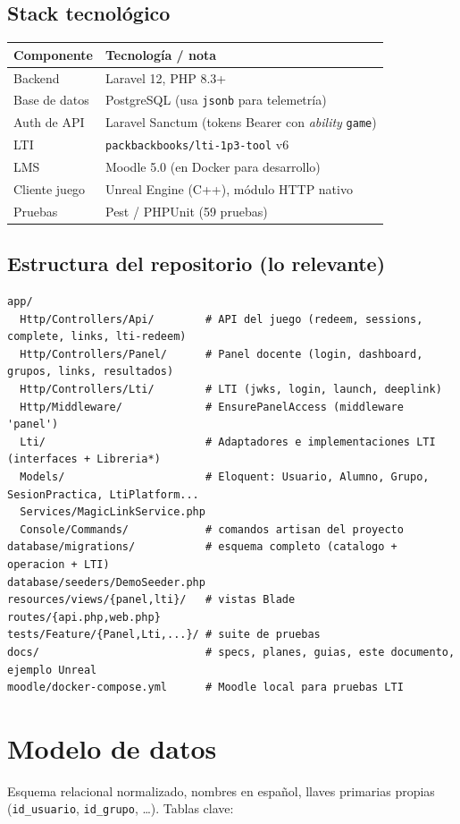 \documentclass[11pt,letterpaper]{article}
\begin{document}
\subsection{Stack tecnológico}
\begin{longtable}{p{4cm} p{11cm}}
\toprule \textbf{Componente} & \textbf{Tecnología / nota} \\ \midrule
\endhead
Backend & Laravel 12, PHP 8.3+ \\
Base de datos & PostgreSQL (usa \texttt{jsonb} para telemetría) \\
Auth de API & Laravel Sanctum (tokens Bearer con \emph{ability} \texttt{game}) \\
LTI & \texttt{packbackbooks/lti-1p3-tool} v6 \\
LMS & Moodle 5.0 (en Docker para desarrollo) \\
Cliente juego & Unreal Engine (C++), módulo HTTP nativo \\
Pruebas & Pest / PHPUnit (59 pruebas) \\
\bottomrule
\end{longtable}

\subsection{Estructura del repositorio (lo relevante)}
\begin{lstlisting}
app/
  Http/Controllers/Api/        # API del juego (redeem, sessions, complete, links, lti-redeem)
  Http/Controllers/Panel/      # Panel docente (login, dashboard, grupos, links, resultados)
  Http/Controllers/Lti/        # LTI (jwks, login, launch, deeplink)
  Http/Middleware/             # EnsurePanelAccess (middleware 'panel')
  Lti/                         # Adaptadores e implementaciones LTI (interfaces + Libreria*)
  Models/                      # Eloquent: Usuario, Alumno, Grupo, SesionPractica, LtiPlatform...
  Services/MagicLinkService.php
  Console/Commands/            # comandos artisan del proyecto
database/migrations/           # esquema completo (catalogo + operacion + LTI)
database/seeders/DemoSeeder.php
resources/views/{panel,lti}/   # vistas Blade
routes/{api.php,web.php}
tests/Feature/{Panel,Lti,...}/ # suite de pruebas
docs/                          # specs, planes, guias, este documento, ejemplo Unreal
moodle/docker-compose.yml      # Moodle local para pruebas LTI
\end{lstlisting}

\section{Modelo de datos}
Esquema relacional normalizado, nombres en español, llaves primarias propias
(\texttt{id\_usuario}, \texttt{id\_grupo}, \ldots). Tablas clave:
\end{document}
